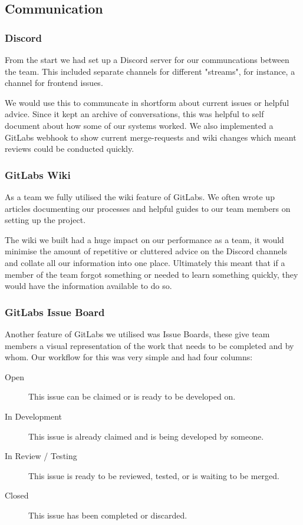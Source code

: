 \documentclass{article}
\begin{document}
\subsection{Communication}
\subsubsection{Discord}
From the start we had set up a Discord server for our communcations between the team. This included separate channels for different "streams", for instance, a channel for frontend issues.

We would use this to communcate in shortform about current issues or helpful advice. Since it kept an archive of conversations, this was helpful to self document about how some of our systems worked. We also implemented a GitLabs webhook to show current merge-requests and wiki changes which meant reviews could be conducted quickly.

\subsubsection{GitLabs Wiki}
As a team we fully utilised the wiki feature of GitLabs. We often wrote up articles documenting our processes and helpful guides to our team members on setting up the project.

The wiki we built had a huge impact on our performance as a team, it would minimise the amount of repetitive or cluttered advice on the Discord channels and collate all our information into one place. Ultimately this meant that if a member of the team forgot something or needed to learn something quickly, they would have the information available to do so.

\subsubsection{GitLabs Issue Board}
Another feature of GitLabs we utilised was Issue Boards, these give team members a visual representation of the work that needs to be completed and by whom. Our workflow for this was very simple and had four columns:

\begin{description}
  \item[Open] This issue can be claimed or is ready to be developed on.
  \item[In Development] This issue is already claimed and is being developed by someone.
  \item[In Review / Testing] This issue is ready to be reviewed, tested, or is waiting to be merged.
  \item[Closed] This issue has been completed or discarded.
\end{description}
\end{document}
